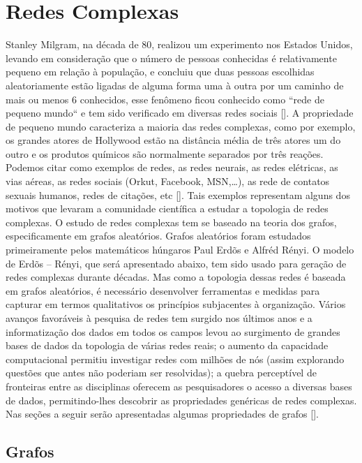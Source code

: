\documentclass[brazil,ruledheader]{abnt}
\renewcommand{\cite}[1]{[\citeonline{#1}]}
\begin{document}
\section{Redes Complexas}

Stanley Milgram, na década de 80, realizou um experimento nos Estados
Unidos, levando em consideração que o número de pessoas conhecidas é
relativamente pequeno em relação à população, e concluiu que duas
pessoas escolhidas aleatoriamente estão ligadas de alguma forma uma à outra
por um caminho de mais ou menos 6 conhecidos, esse fenômeno ficou conhecido
como ``rede de pequeno mundo`` e tem sido verificado em diversas redes sociais
\cite{Bo04,AlBa02}. A propriedade de pequeno mundo
caracteriza a maioria das redes complexas, como por exemplo, os grandes atores
de Hollywood estão na distância média de três atores um do outro e os produtos
químicos 
 são normalmente separados por três reações. Podemos citar como
exemplos de redes, as redes neurais, as redes elétricas, as vias aéreas, as
redes sociais (Orkut, Facebook, MSN,\dots), as rede de contatos sexuais humanos,
redes de citações, etc \cite{Bo04,AlBa02}. Tais exemplos representam alguns dos
motivos que levaram
a
comunidade científica a estudar a topologia de redes complexas. O estudo de
redes
complexas tem se baseado na teoria dos grafos, especificamente em grafos
aleatórios. Grafos aleatórios foram estudados primeiramente pelos matemáticos
húngaros Paul Erdõs e Alfréd Rényi. O modelo de Erdõs – Rényi, que será
apresentado abaixo, tem sido usado para geração de redes complexas durante
décadas. Mas como a
topologia dessas redes é baseada em grafos aleatórios, é necessário desenvolver
ferramentas e medidas para capturar em termos qualitativos os princípios
subjacentes à organização. Vários avanços favoráveis à pesquisa de redes tem
surgido nos últimos anos e a informatização  dos dados em todos os campos levou
ao surgimento de grandes bases de dados da topologia de várias redes reais; o
aumento da capacidade computacional permitiu investigar redes com milhões de
nós (assim explorando questões que antes não poderiam ser resolvidas); a
quebra perceptível de fronteiras entre as disciplinas oferecem as
pesquisadores o acesso a diversas bases de dados, permitindo-lhes descobrir
as propriedades genéricas de redes complexas. Nas seções a seguir
serão apresentadas algumas propriedades de grafos \cite{Bo04,AlBa02}.

\subsection{Grafos}
\end{document}
